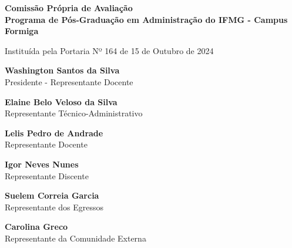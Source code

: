 \begin{center}
    \vspace*{2cm}
    {\Large\textbf{Comissão Própria de Avaliação}}\\
    \vspace{0.3cm}
    {\Large\textbf{Programa de Pós-Graduação em
Administração do IFMG - Campus Formiga}}
    
    \vspace{0.5cm}
    {\small Instituída pela Portaria Nº 164 de 15 de Outubro de 2024}
    
    \vspace{2cm}
    
    \begin{minipage}{0.8\textwidth}
        \centering
        \textbf{Washington Santos da Silva}\\
        Presidente - Representante Docente
        
        \vspace{1cm}
        
        \textbf{Elaine Belo Veloso da Silva}\\
        Representante Técnico-Administrativo
        
        \vspace{1cm}
        
        \textbf{Lelis Pedro de Andrade}\\
        Representante Docente
        
        \vspace{1cm}
        
        \textbf{Igor Neves Nunes}\\
        Representante Discente
        
        \vspace{1cm}
        
        \textbf{Suelem Correia Garcia}\\
        Representante dos Egressos
        
        \vspace{1cm}
        
        \textbf{Carolina Greco}\\
        Representante da Comunidade Externa
    \end{minipage}
\end{center}


\clearpage
{}


